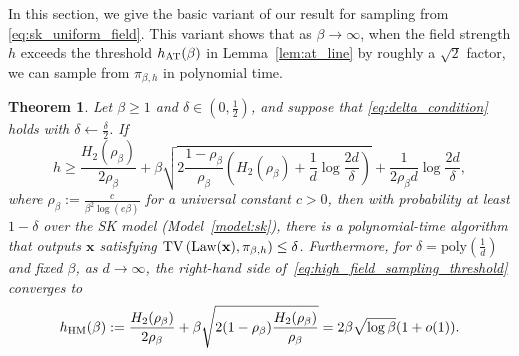 \documentclass[11pt]{article}
\newtheorem{theorem}{Theorem}
\newcommand{\defeq}{:=}
\newcommand{\half}{\frac{1}{2}}
\newcommand{\1}{\mathbf{1}}
\newcommand{\0}{\mathbf{0}}
\newcommand{\Par}[1]{\left(#1\right)}
\newcommand{\poly}{\mathrm{poly}}
\newcommand{\TV}[1]{\mathrm{TV}\left(#1\right)}
\newcommand{\Law}{\textup{Law}}
\newcommand{\vx}{{\mathbf{x}}}
\newcommand{\AT}{_{\rm AT}}
\begin{document}
In this section, we give the basic variant of our result for sampling from \eqref{eq:sk_uniform_field}. This variant shows that as $\beta \to \infty$, when the field strength $h$ exceeds the threshold $h\AT(\beta)$ in Lemma~\ref{lem:at_line} by roughly a $\sqrt{2}$ factor, we can sample from $\pi_{\beta, h}$ in polynomial time.

\begin{theorem}
\label{thm:unrestricted_high_field_sk}
    Let $\beta\ge1$ and $\delta\in(0,\half)$, and suppose that
    \eqref{eq:delta_condition} holds with $\delta\gets \frac \delta 2$.
    If     \begin{equation}
        \label{eq:high_field_sampling_threshold}
        h
        \ge
        \frac{H_2(\rho_\beta)}{2\rho_\beta}
        +
        \beta
        \sqrt{
            2\frac{1-\rho_\beta}{\rho_\beta}
            \Par{
                H_2(\rho_\beta)
                +
                \frac 1 d\log \frac{2d}{\delta}
            }
        }
        +
        \frac{1}{2\rho_\beta d}
        \log\frac{2d}{\delta},
    \end{equation}
    where $\rho_\beta \defeq \frac{c}{\beta^2 \log(e\beta)}$ for a universal constant $c > 0$,
    then with
    probability at least $1-\delta$ over the SK model (Model~\ref{model:sk}), there is a
    polynomial-time algorithm that outputs $\vx$ satisfying $        \TV{\Law(\vx),\pi_{\beta,h}}
        \le
        \delta$.
    Furthermore, for $\delta = \poly(\frac 1 d)$ and fixed $\beta$, as $d \to \infty$, the right-hand side
    of~\eqref{eq:high_field_sampling_threshold} converges to
    \begin{equation}
        \label{eq:thermodynamic_sampling_curve}
        h_{\rm HM}(\beta) \defeq \frac{H_2(\rho_\beta)}{2\rho_\beta}
    +
    \beta
    \sqrt{
        2(1-\rho_\beta)
        \frac{H_2(\rho_\beta)}{\rho_\beta} 
    } = 2\beta\sqrt{\log\beta}(1 + o(1)).
    \end{equation}
\end{theorem}
\end{document}
